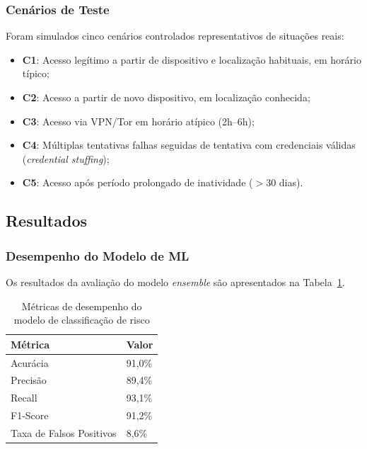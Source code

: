 \documentclass[12pt]{article}
\begin{document}
\subsubsection{Cenários de Teste}

Foram simulados cinco cenários controlados representativos de situações reais:

\begin{itemize}[leftmargin=*]
    \item \textbf{C1}: Acesso legítimo a partir de dispositivo e localização habituais, em horário típico;
    \item \textbf{C2}: Acesso a partir de novo dispositivo, em localização conhecida;
    \item \textbf{C3}: Acesso via VPN/Tor em horário atípico (2h--6h);
    \item \textbf{C4}: Múltiplas tentativas falhas seguidas de tentativa com credenciais válidas (\textit{credential stuffing});
    \item \textbf{C5}: Acesso após período prolongado de inatividade ($>$30 dias).
\end{itemize}

\subsection{Resultados}

\subsubsection{Desempenho do Modelo de ML}

Os resultados da avaliação do modelo \textit{ensemble} são apresentados na Tabela~\ref{tab:ml_results}.

\begin{table}[H]
\centering
\caption{Métricas de desempenho do modelo de classificação de risco}
\label{tab:ml_results}
\small
\begin{tabular}{@{}ll@{}}
\toprule
\textbf{Métrica} & \textbf{Valor} \\
\midrule
Acurácia                 & 91,0\% \\
Precisão                 & 89,4\% \\
Recall                   & 93,1\% \\
F1-Score                 & 91,2\% \\
Taxa de Falsos Positivos & 8,6\% \\
\bottomrule
\end{tabular}
\end{table}
\end{document}

